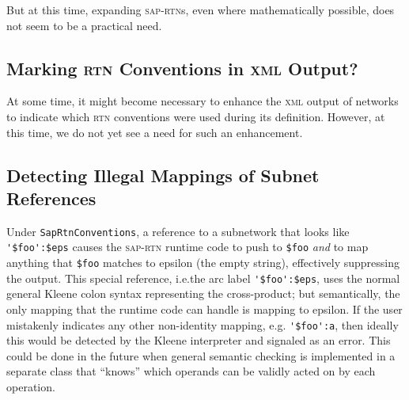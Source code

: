 \documentclass[letterpaper,12pt]{article}
\providecommand{\acro}{}\renewcommand{\acro}{\textsc}
\begin{document}
\noindent
But at this time, expanding \acro{sap-rtn}s, even where mathematically possible, does
not seem to be a practical need.

\subsection{Marking \acro{rtn} Conventions in \acro{xml} Output?}

At some time, it might become necessary to enhance the \acro{xml} output of networks
to indicate which \acro{rtn} conventions were used during its definition.  However,
at this time, we do not yet see a need for such an enhancement.

\subsection{Detecting Illegal Mappings of Subnet References}

Under \texttt{SapRtnConventions}, a reference to a subnetwork that looks like
\verb!'$foo':$eps! causes the \acro{sap-rtn} runtime code to push to \verb!$foo!
\emph{and} to map anything
that \verb!$foo! matches to epsilon (the empty string), effectively suppressing the
output. This special reference, i.e.\@ the arc label \verb!'$foo':$eps!, uses the normal general Kleene colon syntax representing the
cross-product; but semantically, the only mapping that the runtime code can handle is
mapping to epsilon.  If the user mistakenly indicates any other non-identity mapping, e.g.
\verb!'$foo':a!, then ideally this would be detected by the Kleene interpreter and
signaled as an error.  This could be done in the future when general semantic
checking is implemented in a separate class that ``knows'' which operands can be
validly acted on by each operation.
\end{document}

